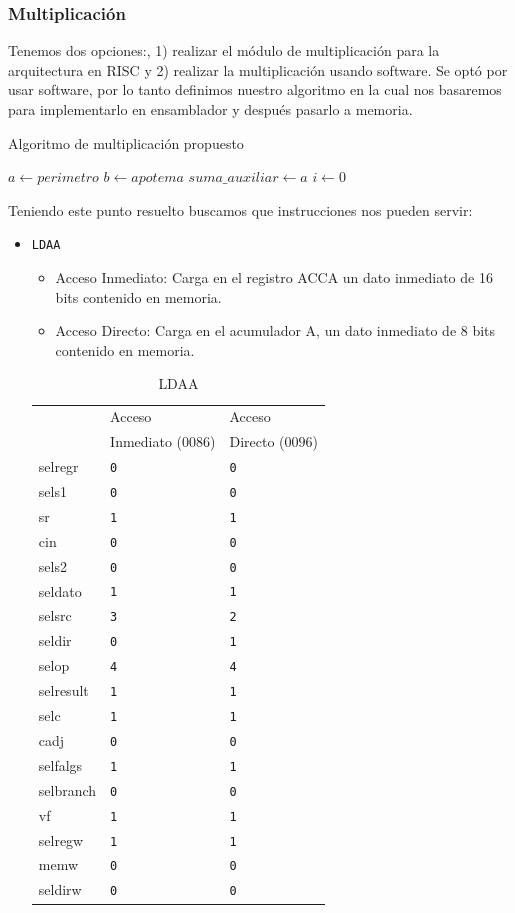 \documentclass{IEEEtran}
\begin{document}
\subsubsection{Multiplicación}
\label{sec:orgb86238b}
Tenemos dos opciones:, 1) realizar el módulo de multiplicación para la arquitectura en RISC y 2) realizar la multiplicación usando software. Se optó por usar software, por lo tanto definimos nuestro algoritmo en la cual nos basaremos para implementarlo en ensamblador y después pasarlo a memoria.
\begin{algorithm}
\caption{Algoritmo de multiplicación propuesto}
$a \gets perimetro$\;
$b \gets apotema$\;
$suma\_auxiliar \gets a$\;
$i \gets 0$\;
\end{algorithm}
Teniendo este punto resuelto buscamos que instrucciones nos pueden servir\cite[pp. 24-26]{PM1999}:
\begin{itemize}
\item \texttt{LDAA}
\begin{itemize}
\item Acceso Inmediato: Carga en el registro ACCA un dato inmediato de 16 bits contenido en memoria.
\item Acceso Directo: Carga en el acumulador A, un dato inmediato de 8 bits contenido en memoria.
\end{itemize}
\begin{table}[htbp]
\caption{LDAA}
\centering
\begin{tabular}{lll}
\hline
 & Acceso & Acceso\\
 & Inmediato (\(0086\)) & Directo (\(0096\))\\
\hline
selregr & \texttt{0} & \texttt{0}\\
sels1 & \texttt{0} & \texttt{0}\\
sr & \texttt{1} & \texttt{1}\\
cin & \texttt{0} & \texttt{0}\\
sels2 & \texttt{0} & \texttt{0}\\
seldato & \texttt{1} & \texttt{1}\\
selsrc & \texttt{3} & \texttt{2}\\
seldir & \texttt{0} & \texttt{1}\\
selop & \texttt{4} & \texttt{4}\\
selresult & \texttt{1} & \texttt{1}\\
selc & \texttt{1} & \texttt{1}\\
cadj & \texttt{0} & \texttt{0}\\
selfalgs & \texttt{1} & \texttt{1}\\
selbranch & \texttt{0} & \texttt{0}\\
vf & \texttt{1} & \texttt{1}\\
selregw & \texttt{1} & \texttt{1}\\
memw & \texttt{0} & \texttt{0}\\
seldirw & \texttt{0} & \texttt{0}\\
\hline
\end{tabular}
\end{table}
\end{itemize}
\end{document}
